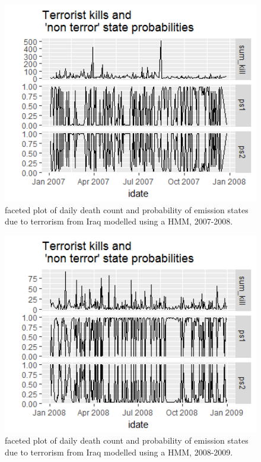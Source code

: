 \begin{figure}[t]
\includegraphics[width=15cm]{Peters_experiment_markdown_files/figure-latex/Rplot02_2007_2008.png}
\caption{faceted plot of daily death count and probability of emission states due to terrorism from Iraq modelled using a HMM, 2007-2008.}
\label{fig:Rplot02_2007_2008}
\centering
\end{figure}

\begin{figure}[t]
\includegraphics[width=15cm]{Peters_experiment_markdown_files/figure-latex/Rplot02_200_2009.png}
\caption{faceted plot of daily death count and probability of emission states due to terrorism from Iraq modelled using a HMM, 2008-2009.}
\label{fig:Rplot02_2008_2009}
\centering
\end{figure}

